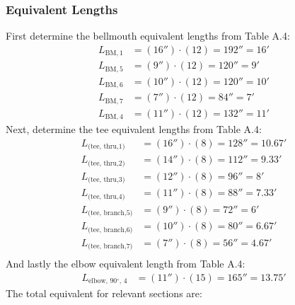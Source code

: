 \subsubsection{Equivalent Lengths}
First determine the bellmouth equivalent lengths from Table A.4:
\begin{align*}
    L_{\text{BM}, 1} &= (16'') \cdot (12) = 192'' = 16' \\
    L_{\text{BM}, 5} &= (9'') \cdot (12) = 120'' = 9' \\
    L_{\text{BM}, 6} &= (10'') \cdot (12) = 120'' = 10' \\
    L_{\text{BM}, 7} &= (7'') \cdot (12) = 84'' = 7' \\
    L_{\text{BM}, 4} &= (11'') \cdot (12) = 132'' = 11' 
\end{align*}
Next, determine the tee equivalent lengths from Table A.4:
\begin{align*}
    L_{\text{(tee, thru,} 1)} &= (16'') \cdot (8) = 128'' = 10.67' \\
    L_{\text{(tee, thru,} 2)} &= (14'') \cdot (8) = 112'' = 9.33' \\
    L_{\text{(tee, thru,} 3)} &= (12'') \cdot (8) = 96'' = 8' \\
    L_{\text{(tee, thru,} 4)} &= (11'') \cdot (8) = 88'' = 7.33' \\
    L_{\text{(tee, branch,}5)} &= (9'') \cdot (8) = 72'' = 6' \\
    L_{\text{(tee, branch,}6)} &= (10'') \cdot (8) = 80'' = 6.67' \\
    L_{\text{(tee, branch,}7)} &= (7'') \cdot (8) = 56'' = 4.67' \\
\end{align*}
And lastly the elbow equivalent length from Table A.4:
\begin{align*}
    L_{\text{elbow, 90$^\circ$, 4}} &= (11'') \cdot (15) = 165'' = 13.75'
\end{align*}
The total equivalent for relevant sections are:
